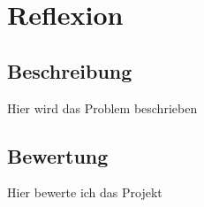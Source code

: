 \chapter{Reflexion}
\section{Beschreibung}
Hier wird das Problem beschrieben
\section{Bewertung}
Hier bewerte ich das Projekt
